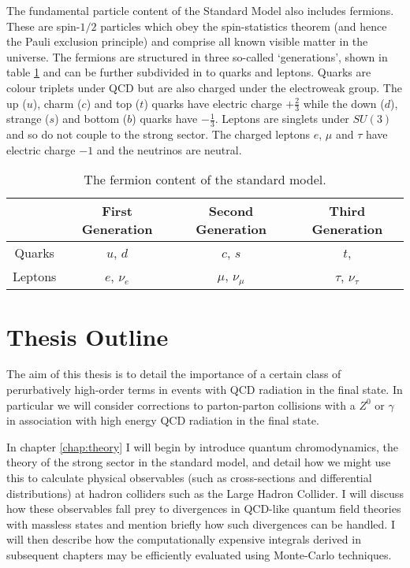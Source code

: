 	The fundamental particle content of the Standard Model also includes fermions. These are spin-$1/2$ particles which obey the spin-statistics theorem (and
	hence the Pauli exclusion principle) and comprise all known visible matter in the universe.
	The fermions are structured in three so-called `generations', shown in table \ref{tab:fermions} and can be further subdivided in to quarks and leptons.
	Quarks are colour triplets under QCD but are also charged under the electroweak group.  The up ($u$), charm ($c$) and top ($t$) quarks have electric charge
	$+\frac{2}{3}$ while the down ($d$), strange ($s$) and bottom ($b$) quarks have $-\frac{1}{3}$.
	Leptons are singlets under $SU(3)$ and so do not couple to the strong sector.  The charged leptons $e$, $\mu$ and $\tau$ have electric charge
	$-1$ and the neutrinos are neutral.

	\begin{table}[htp!]
	\begin{center}
	\begin{tabular}{c | c | c | c}
	        & First Generation & Second Generation & Third Generation   \\ \hline
	Quarks  &  $u$, $d$        & $c$, $s$          & $t$,               \\ \hline
	Leptons &  $e$, $\nu_e$    & $\mu$, $\nu_\mu$  & $\tau$, $\nu_\tau$ \\
	\end{tabular}
	\caption{The fermion content of the standard model.}
	\label{tab:fermions}
	\end{center}
	\end{table}

\section{Thesis Outline}
\label{sec:outline}

	The aim of this thesis is to detail the importance of a certain class of perurbatively high-order terms in events with QCD radiation in the final state.  In particular
	we will consider corrections to parton-parton collisions with a $Z^0$ or $\gamma$ in association with high energy QCD radiation in the final state.

	In chapter \ref{chap:theory} I will begin by introduce quantum chromodynamics, the theory of the strong sector in the standard model, and detail how we might use this
	to calculate physical observables (such as cross-sections and differential distributions) at hadron colliders such as the Large Hadron Collider.  I will discuss how
	these observables fall prey to divergences in QCD-like quantum field theories with massless states and mention briefly how such divergences can be handled.  I will then
	describe how the computationally expensive integrals derived in subsequent chapters may be efficiently evaluated using Monte-Carlo techniques.


